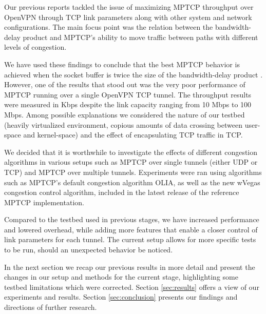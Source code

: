 Our previous reports tackled the issue of maximizing MPTCP throughput over
OpenVPN through TCP link parameters along with other system and network configurations. The main focus point was the relation between the bandwidth-delay product and MPTCP's ability to move traffic between paths with different levels of congestion.

We have used these findings to conclude that the best MPTCP behavior is achieved when the socket buffer is twice the size of the bandwidth-delay product \cite{sem2}. However, one of the results that stood out was the very poor performance of MPTCP running over a single OpenVPN TCP tunnel. The throughput results were measured in Kbps despite the link capacity ranging from 10 Mbps to 100 Mbps. Among possible explanations we considered the nature of our testbed (heavily virtualized environment, copious amounts of data crossing between user-space and kernel-space) and the effect of encapsulating TCP traffic in TCP.

We decided that it is worthwhile to investigate the effects of different
congestion algorithms in various setups such as MPTCP over single tunnels
(either UDP or TCP) and MPTCP over multiple tunnels. Experiments were ran
using algorithms such as MPTCP's default congestion algorithm OLIA, as well as
the new wVegas congestion control algorithm, included in the latest release of
the reference MPTCP implementation.

Compared to the testbed used in previous stages, we have increased performance
and lowered overhead, while adding more features that enable a closer control
of link parameters for each tunnel. The current setup allows for more specific
tests to be run, should an unexpected behavior be noticed.

In the next section we recap our previous results in more detail and present
the changes in our setup and methods for the current stage, highlighting some
testbed limitations which were corrected. Section \ref{sec:results} offers a
view of our experiments and results. Section \ref{sec:conclusion} presents our
findings and directions of further research.
